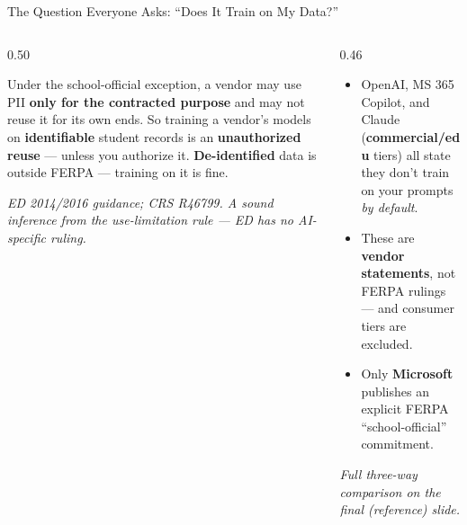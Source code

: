 \documentclass[aspectratio=169, 10pt]{beamer}
\newcommand{\cmcite}[1]{{\scriptsize\color{CoolGray}\textit{#1}}}
\begin{document}
\begin{frame}{The Question Everyone Asks: ``Does It Train on My Data?''}
\begin{columns}[T]
\begin{column}{0.50\textwidth}
\begin{tcolorbox}[keybox, title={\faBrain\quad The FERPA answer}, top=3pt, bottom=3pt]
\small
Under the school-official exception, a vendor may use PII \textbf{only for the contracted purpose} and may not reuse it for its own ends.
\vskip3pt
So training a vendor's models on \textbf{identifiable} student records is an \textbf{unauthorized reuse} --- unless you authorize it.
\vskip3pt
\textbf{De-identified} data is outside FERPA --- training on it is fine.
\end{tcolorbox}
\vskip3pt
\cmcite{ED 2014/2016 guidance; CRS R46799. A sound inference from the use-limitation rule --- ED has no AI-specific ruling.}
\end{column}
\begin{column}{0.46\textwidth}
\begin{tcolorbox}[coralbox, title={\faExclamationTriangle\quad The vendor reality}, top=2pt, bottom=2pt]
\small
\begin{itemize}\setlength{\itemsep}{1pt}
  \item OpenAI, MS 365 Copilot, and Claude (\textbf{commercial/edu} tiers) all state they don't train on your prompts \emph{by default}.
  \item These are \textbf{vendor statements}, not FERPA rulings --- and consumer tiers are excluded.
  \item Only \textbf{Microsoft} publishes an explicit FERPA ``school-official'' commitment.
\end{itemize}
\end{tcolorbox}
\vskip3pt
\cmcite{Full three-way comparison on the final (reference) slide.}
\end{column}
\end{columns}
\end{frame}
\end{document}
